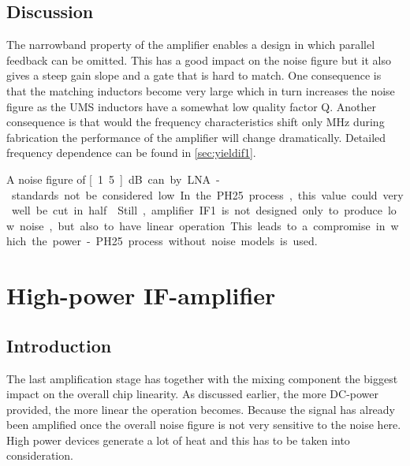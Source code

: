 		\subsection{Discussion}
			The narrowband property of the amplifier enables a design in which parallel feedback can be omitted. This has a good impact on the noise figure but it also gives a steep gain slope and a gate that is hard to match. One consequence is that the matching inductors become very large which in turn increases the noise figure as the UMS inductors have a somewhat low quality factor Q. Another consequence is that would the frequency characteristics shift only \unit[100]{MHz} during fabrication the performance of the amplifier will change dramatically. Detailed frequency dependence can be found in \autoref{sec:yieldif1}.

			A noise figure of \unit[1.5]{dB} can by LNA-standards not be considered low. In the PH25 process, this value could very well be cut in half.\autocite{kyuko96} Still, amplifier IF1 is not designed only to produce  low  noise, but also to have linear operation. This leads to a compromise in which the power-PH25 process without noise models is used.


	\section{High-power IF-amplifier}
		\subsection{Introduction}\label{sec:if2power}
			The last amplification stage has together with the mixing component the biggest impact on the overall chip linearity. As discussed earlier, the more DC-power provided, the more linear the operation becomes. Because the signal has already been amplified once the overall noise figure is not very sensitive to the noise here. High power devices generate a lot of heat and this has to be taken into consideration.

